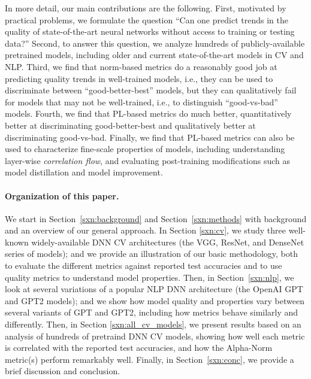 In more detail, our main contributions are the following.
First, 
motivated by practical problems, we formulate the question ``Can one predict trends in the quality of state-of-the-art neural networks without access to training or testing data?''
Second, 
to answer this question, we analyze hundreds of publicly-available pretrained models, including older and current state-of-the-art models in CV and NLP.
Third, 
we find that norm-based metrics do a reasonably good job at predicting quality trends in well-trained models, i.e., they can be used to discriminate between ``good-better-best'' models, but they can qualitatively fail for models that may not be well-trained, i.e., to distinguish ``good-vs-bad'' models.
Fourth, 
we find that PL-based metrics do much better, quantitatively better at discriminating good-better-best and qualitatively better at discriminating good-vs-bad.
Finally, 
we find that PL-based metrics can also be used to characterize fine-scale properties of models, including understanding layer-wise \emph{correlation flow}, and evaluating post-training modifications such as model distillation and model improvement.


\paragraph{Organization of this paper.}

We start in Section~\ref{sxn:background} and Section~\ref{sxn:methods} with background and an overview of our general approach.
In Section \ref{sxn:cv}, we study three well-known widely-available DNN CV architectures (the VGG, ResNet, and DenseNet series of models); and we provide an illustration of our basic methodology, both to evaluate the different metrics against reported test accuracies and to use quality metrics to understand model properties.
Then, in Section~\ref{sxn:nlp}, we look at several variations of a popular NLP DNN architecture (the OpenAI GPT and GPT2 models); and we show how model quality and properties vary between several variants of GPT and GPT2, including how metrics behave similarly and differently.
Then, in Section \ref{sxn:all_cv_models}, we present results based on an analysis of hundreds of pretraind DNN CV models, showing how well each metric is correlated with the reported test accuracies, and how the Alpha-Norm metric(s) perform remarkably well.
Finally, in Section~\ref{sxn:conc}, we provide a brief discussion and conclusion.


